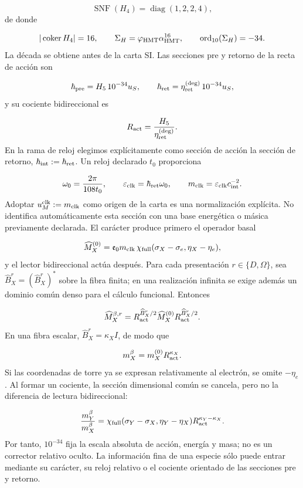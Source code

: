 \[
\operatorname{SNF}(H_4)=\operatorname{diag}(1,2,2,4),
\]
de donde

\[
|\operatorname{coker}H_4|=16,
\qquad
\Sigma_H=\varphi_{\rm HMT}\alpha_{\rm HMT}^{16},
\qquad
\operatorname{ord}_{10}(\Sigma_H)=-34.
\]
La década se obtiene antes de la carta SI. Las secciones pre y retorno de la recta de acción son

\[
\hbar_{\rm pre}=H_5\,10^{-34}u_S,
\qquad
\hbar_{\rm ret}=\eta_{\rm ret}^{(\deg)}\,10^{-34}u_S,
\]
y su cociente bidireccional es

\[
R_{\rm act}=\frac{H_5}{\eta_{\rm ret}^{(\deg)}}.
\]
En la rama de reloj elegimos explícitamente como sección de acción la sección de retorno, \(\hbar_{\rm int}:=\hbar_{\rm ret}\). Un reloj declarado \(t_0\) proporciona

\[
\omega_0=\frac{2\pi}{108t_0},
\qquad
\varepsilon_{\rm clk}=\hbar_{\rm ret}\omega_0,
\qquad
m_{\rm clk}=\varepsilon_{\rm clk}c_{\rm int}^{-2}.
\]
Adoptar \(u_M^{\rm clk}:=m_{\rm clk}\) como origen de la carta es una normalización explícita. No identifica automáticamente esta sección con una base energética o másica previamente declarada. El carácter produce primero el operador basal

\[
\widehat M_X^{(0)}
=\mathfrak e_0m_{\rm clk}\,
\chi_{\rm full}(\sigma_X-\sigma_e,\eta_X-\eta_e),
\]
y el lector bidireccional actúa después. Para cada presentación \(r\in\{D,\Omega\}\), sea \(\widehat B_X^r=(\widehat B_X^r)^*\) sobre la fibra finita; en una realización infinita se exige además un dominio común denso para el cálculo funcional. Entonces

\[
\widehat M_X^{\beta,r}
=R_{\rm act}^{\widehat B_X^r/2}
\widehat M_X^{(0)}
R_{\rm act}^{\widehat B_X^r/2}.
\]
En una fibra escalar, \(\widehat B_X^r=\kappa_XI\), de modo que

\[
m_X^\beta=m_X^{(0)}R_{\rm act}^{\kappa_X}.
\]
Si las coordenadas de torre ya se expresan relativamente al electrón, se omite \(-\eta_e\). Al formar un cociente, la sección dimensional común se cancela, pero no la diferencia de lectura bidireccional:

\[
\frac{m_Y^\beta}{m_X^\beta}
=\chi_{\rm full}(\sigma_Y-\sigma_X,\eta_Y-\eta_X)
R_{\rm act}^{\kappa_Y-\kappa_X}.
\]
Por tanto, \(10^{-34}\) fija la escala absoluta de acción, energía y masa; no es un corrector relativo oculto. La información fina de una especie sólo puede entrar mediante su carácter, su reloj relativo o el cociente orientado de las secciones pre y retorno.


